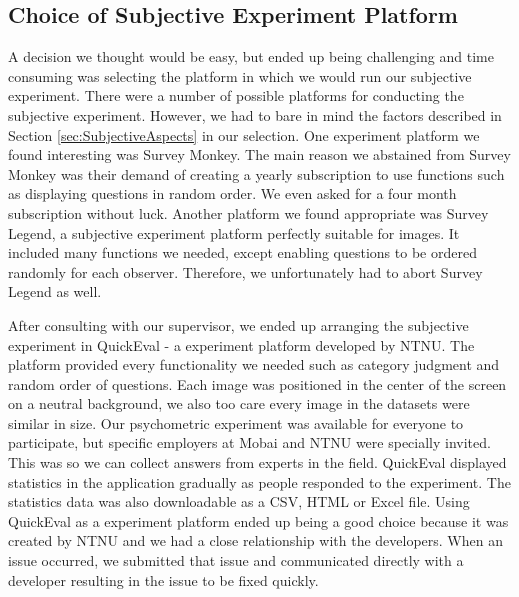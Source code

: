 \subsection{Choice of Subjective Experiment Platform}
\label{subsection:choicesoftware}
A decision we thought would be easy, but ended up being challenging and time consuming was selecting the platform in which we would run our subjective experiment. There were a number of possible platforms for conducting the subjective experiment. However, we had to bare in mind the factors described in Section \ref{sec:SubjectiveAspects} in our selection. One experiment platform we found interesting was Survey Monkey. The main reason we abstained from Survey Monkey was their demand of creating a yearly subscription to use functions such as displaying questions in random order. We even asked for a four month subscription without luck. Another platform we found appropriate was Survey Legend, a subjective experiment platform perfectly suitable for images. It included many functions we needed, except enabling questions to be ordered randomly for each observer. Therefore, we unfortunately had to abort Survey Legend as well. 

After consulting with our supervisor, we ended up arranging the subjective experiment in QuickEval \cite{QuickEval} - a experiment platform developed by NTNU. The platform provided every functionality we needed such as category judgment and random order of questions. Each image was positioned in the center of the screen on a neutral background, we also too care every image in the datasets were similar in size. Our psychometric experiment was available for everyone to participate, but specific employers at Mobai and NTNU were specially invited. This was so we can collect answers from experts in the field. QuickEval displayed statistics in the application gradually as people responded to the experiment. The statistics data was also downloadable as a CSV, HTML or Excel file. 
Using QuickEval as a experiment platform ended up being a good choice because it was created by NTNU and we had a close relationship with the developers. When an issue occurred, we submitted that issue and communicated directly with a developer resulting in the issue to be fixed quickly. 

